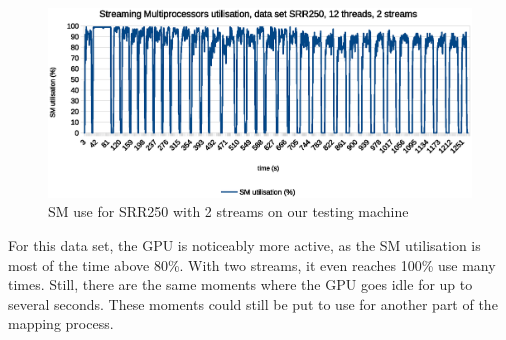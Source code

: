 \begin{figure}[h]
	\centering
	\includegraphics[width=0.9\linewidth]{SM_utilisation_12threads2streams_SRR250}
	\caption{SM use for SRR250 with 2 streams on our testing machine}
	\label{fig:sm-use-srr250-2str}
\end{figure}

For this data set, the GPU is noticeably more active, as the SM utilisation is most of the time above 80\%. With two streams, it even reaches 100\% use many times. Still, there are the same moments where the GPU goes idle for up to several seconds. These moments could still be put to use for another part of the mapping process.